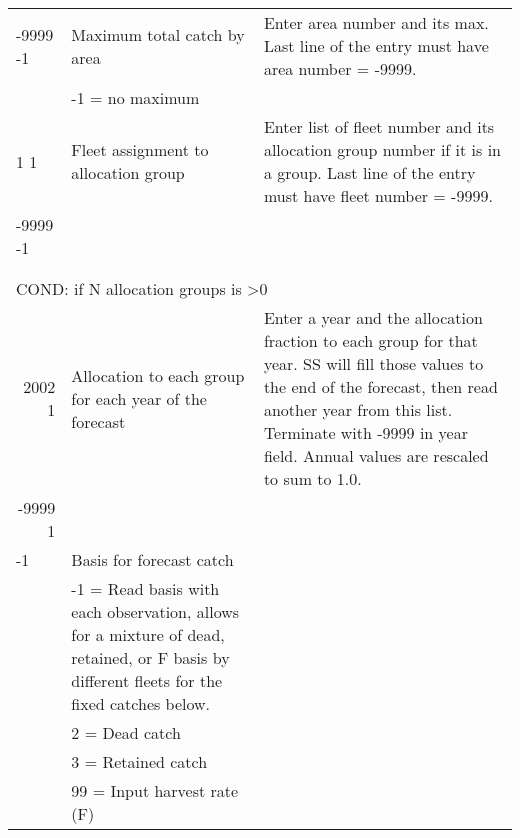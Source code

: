 \begin{landscape}
\begin{longtable}{p{3cm} p{7cm} p{11cm}}
  \hline
  -9999 -1 & Maximum total catch by area & \multirow{1}{1cm}[-0.1cm]{\parbox{11cm}{Enter area number and its max. Last line of the entry must have area number = -9999.}} \\
     & -1 = no maximum & \\
     
  \hline
  1 1  & Fleet assignment to allocation group & \multirow{1}{1cm}[-0.1cm]{\parbox{11cm}{Enter list of fleet number and its allocation group number if it is in a group. Last line of the entry must have fleet number = -9999.}} \\
  -9999 -1  & & \\ \\ \\
    
  \multicolumn{3}{l}{COND: if N allocation groups is >0 } \\
  \multicolumn{1}{r}{2002 1}  & Allocation to each group for each year of the forecast & Enter a year and the allocation fraction to each group for that year.  SS will fill those values to the end of the forecast, then read another year from this list.  Terminate with -9999 in year field. Annual values are rescaled to sum to 1.0. \\
  \multicolumn{1}{r}{-9999 1} & & \\
  
  \hline
    -1 & Basis for forecast catch & \\
    & -1 = Read basis with each observation, allows for a mixture of dead, retained, or F basis by different fleets for the fixed catches below. & \\
    & 2 = Dead catch & \\
    & 3 = Retained catch & \\
    & 99 = Input harvest rate (F) & \\
    

\end{longtable}
\end{landscape}
